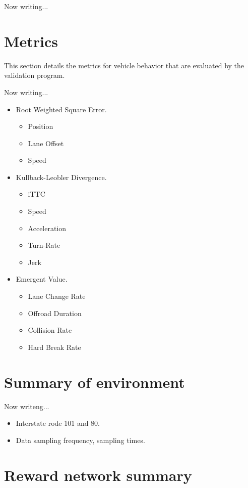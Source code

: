 Now writing...

\section{Metrics}


This section details the metrics for vehicle behavior that are evaluated by the validation program.

Now writing...

\begin{itemize}
\item Root Weighted Square Error.
\begin{itemize}
\item Position
\item Lane Offset
\item Speed
\end{itemize}
\item Kullback-Leobler Divergence.
\begin{itemize}
\item iTTC
\item Speed
\item Acceleration
\item Turn-Rate
\item Jerk
\end{itemize}
\item Emergent Value.
\begin{itemize}
\item Lane Change Rate
\item Offroad Duration
\item Collision Rate
\item Hard Break Rate
\end{itemize}
\end{itemize}

\section{Summary of environment}

Now writeng...

\begin{itemize}
\item Interstate rode 101 and 80.
\item Data sampling frequency, sampling times.
\end{itemize}


\section{Reward network summary}

